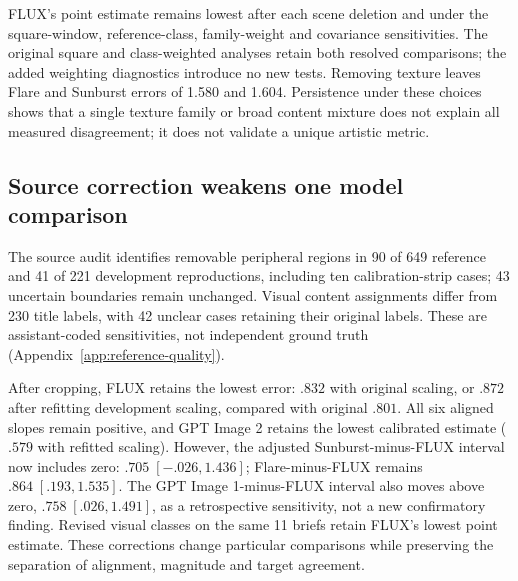 FLUX's point estimate remains lowest after each scene deletion and under the
square-window, reference-class, family-weight and covariance sensitivities.
The original square and class-weighted analyses retain both resolved comparisons;
the added weighting diagnostics introduce no new tests. Removing texture leaves
Flare and Sunburst errors of 1.580 and 1.604. Persistence under these choices
shows that a single texture family or broad content mixture does not explain
all measured disagreement; it does not validate a unique artistic metric.

\subsection{Source correction weakens one model comparison}
The source audit identifies removable peripheral regions in 90 of 649 reference
and 41 of 221 development reproductions, including ten calibration-strip cases;
43 uncertain boundaries remain unchanged. Visual content assignments differ
from 230 title labels, with 42 unclear cases retaining their original labels.
These are assistant-coded sensitivities, not independent ground truth
(Appendix~\ref{app:reference-quality}).

After cropping, FLUX retains the lowest error: $.832$ with original scaling,
or $.872$ after refitting development scaling, compared with original $.801$.
All six aligned slopes remain positive, and GPT Image 2 retains the lowest
calibrated estimate ($.579$ with refitted scaling). However, the adjusted
Sunburst-minus-FLUX interval now includes zero: $.705\;[-.026,1.436]$;
Flare-minus-FLUX remains $.864\;[.193,1.535]$. The GPT Image 1-minus-FLUX
interval also moves above zero, $.758\;[.026,1.491]$, as a retrospective
sensitivity, not a new confirmatory finding. Revised visual classes on the
same 11 briefs retain FLUX's lowest point estimate. These corrections change
particular comparisons while preserving the separation of alignment, magnitude
and target agreement.
